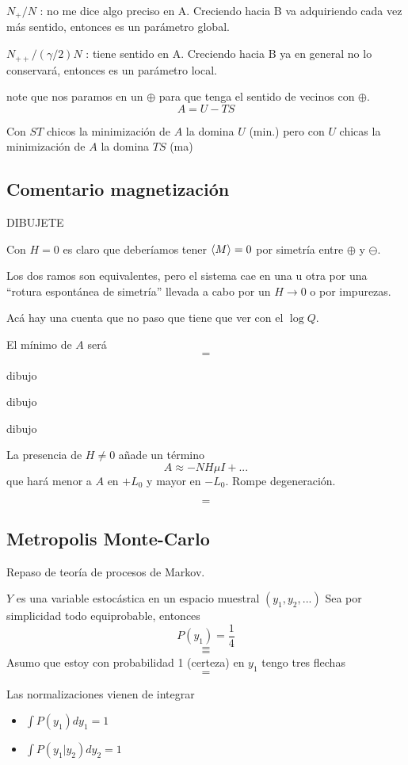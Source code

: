 \documentclass[10pt,oneside]{CBFT_book}
\begin{document}
$N_+ / N$ : no me dice algo preciso en A. Creciendo hacia B va adquiriendo cada vez más sentido, entonces
es un parámetro global.

$N_{++}/(\gamma/2)N$ : tiene sentido en A. Creciendo hacia B ya en general no lo conservará, entonces es
un parámetro local.

 note que nos paramos en un $\oplus$ para que tenga el sentido de
vecinos con $\oplus$.
\[
	A = U - TS
\]

Con $ST$ chicos la minimización de $A$ la domina $U$ (min.) pero con $U$ chicas la minimización de $A$ la domina
$TS$ (ma)

\subsection{Comentario magnetización}

DIBUJETE

Con $H=0$ es claro que deberíamos tener $ \braket{M}=0 $ por simetría entre $\oplus$ y $\ominus$.

Los dos ramos son equivalentes, pero el sistema cae en una u otra por una ``rotura espontánea de simetría''
llevada a cabo por un $ H \to 0 $ o por impurezas.

Acá hay una cuenta que no paso que tiene que ver con el $ \log Q $.

El mínimo de $A$ será 
\[ = \]

dibujo

dibujo

dibujo

La presencia de $ H \neq 0 $ añade un término 
\[
	A \approx - N H \mu I + ...
\]
que hará menor a $ A $ en $ + L_0 $ y mayor en $ - L_0 $. Rompe degeneración.

\[=\]

\subsection{Metropolis Monte-Carlo}

Repaso de teoría de procesos de Markov.

$Y$ es una variable estocástica en un espacio muestral $(y_1, y_2,...)$
Sea por simplicidad todo equiprobable, entonces
\[
	P(y_1) = \frac{1}{4}
\]
\[=\]
\[=\]
Asumo que estoy con probabilidad 1 (certeza) en $y_1$ tengo tres flechas
\[ = \]

Las normalizaciones vienen de integrar
\begin{itemize}
 \item $ \int P(y_1) dy_1 = 1 $
 \item $ \int P(y_1|y_2) dy_2 = 1 $
\end{itemize}
\end{document}
